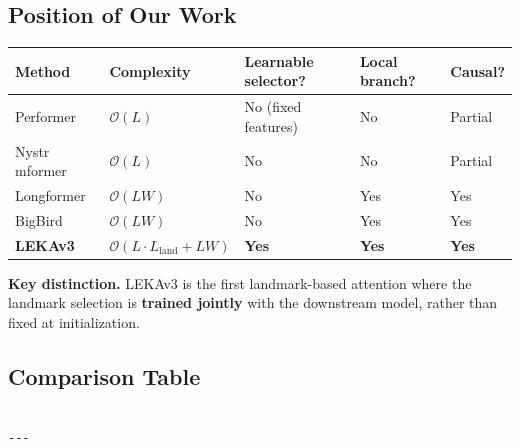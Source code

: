 \subsection{Position of Our Work}

\begin{table}[H]
\centering
\small
\begin{tabular}{lllll}
\toprule
\textbf{Method} & \textbf{Complexity} & \textbf{Learnable selector?} & \textbf{Local branch?} & \textbf{Causal?} \\
\midrule
Performer & $\mathcal{O}(L)$ & No (fixed features) & No & Partial \\
Nystr mformer & $\mathcal{O}(L)$ & No & No & Partial \\
Longformer & $\mathcal{O}(L W)$ & No & Yes & Yes \\
BigBird & $\mathcal{O}(L W)$ & No & Yes & Yes \\
\textbf{LEKAv3} & $\mathcal{O}(L \cdot L_\text{land} + L W)$ & \textbf{Yes} & \textbf{Yes} & \textbf{Yes} \\
\bottomrule
\end{tabular}
\end{table}

\textbf{Key distinction.} LEKAv3 is the first landmark-based attention where the 
landmark selection is \textbf{trained jointly} with the downstream model, rather 
than fixed at initialization.



\subsection{Comparison Table}

\begin{lstlisting}

---
\end{lstlisting}